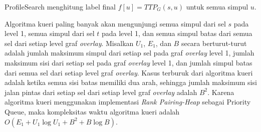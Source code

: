 \begin{algorithm}
\caption{ProfileSearch menghitung label final $f[u]=TTP_G(s,u)$ untuk semua simpul $u$.} 
\label{alg:profileSearch}
\end{algorithm}

Algoritma kueri paling banyak akan mengunjungi semua simpul dari sel $s$ pada level 1, semua simpul dari sel $t$ pada level 1, dan semua simpul batas dari semua sel dari setiap level graf \textit{overlay}. Misalkan $U_1$, $E_1$, dan $B$ secara berturut-turut adalah jumlah maksimum simpul dari setiap sel pada graf \textit{overlay} level 1, jumlah maksimum sisi dari setiap sel pada graf \textit{overlay} level 1, dan jumlah simpul batas  dari semua sel dari setiap level graf \textit{overlay}. Kasus terburuk dari algoritma kueri adalah ketika semua sisi batas memiliki dua arah, sehingga jumlah maksimum sisi jalan pintas dari setiap sel dari setiap level graf \textit{overlay} adalah $B^2$. Karena algoritma kueri menggunakan implementasi \textit{Rank Pairing-Heap} sebagai Priority Queue, maka kompleksitas waktu algoritma kueri adalah $O(E_1+U_1\log U_1+B^{2}+B \log B)$.



